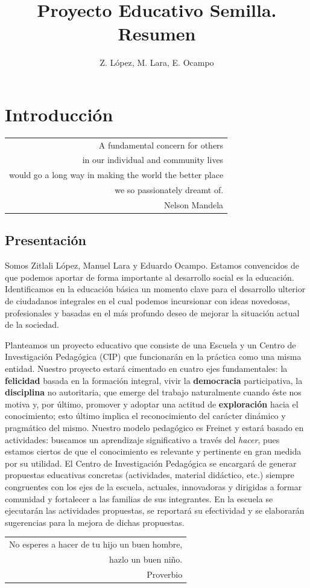 \documentclass[10pt,letterpaper,oneside]{book}
\author{Z. López, M. Lara, E. Ocampo}
\title{Proyecto Educativo Semilla. Resumen}
\makeatletter
\newenvironment{myepigraph}
  {\par\hfill\itshape
   \begin{tabular}{@{}r@{\hspace{2em}}}} %
  {\end{tabular}\par\medskip}
\makeatother
\begin{document}
\maketitle
\tableofcontents

\chapter{Introducción}

\begin{myepigraph}A fundamental concern for others\\
in our individual and community lives\\
would go a long way in making the world the better place\\
we so passionately dreamt of.
\vspace{0.1cm}\\
Nelson Mandela
\end{myepigraph}

\section{Presentación}

Somos Zitlali López, Manuel Lara y Eduardo Ocampo. Estamos convencidos de que podemos aportar de forma importante al desarrollo social es la educación. Identificamos en la educación básica un momento clave para el desarrollo ulterior de ciudadanos integrales en el cual podemos incursionar con ideas novedosas, profesionales y basadas en el más profundo deseo de mejorar la situación actual de la sociedad.

Planteamos un proyecto educativo que consiste de una Escuela y un Centro de Investigación Pedagógica (CIP) que funcionarán en la práctica como una misma entidad. Nuestro proyecto estará cimentado en cuatro ejes fundamentales: la {\bf felicidad} basada en la formación integral, vivir la {\bf democracia} participativa, la {\bf disciplina} no autoritaria, que emerge del trabajo naturalmente cuando éste nos motiva y, por último, promover y adoptar una actitud de {\bf exploración} hacia el conocimiento; esto último implica el reconocimiento del carácter dinámico y pragmático del mismo. Nuestro modelo pedagógico es Freinet y estará basado en actividades: buscamos un aprendizaje significativo a través del \emph{hacer}, pues estamos ciertos de que el conocimiento es relevante y pertinente en gran medida por su utilidad. El Centro de Investigación Pedagógica se encargará de generar propuestas educativas concretas (actividades, material didáctico, etc.) siempre congruentes con los ejes de la escuela, actuales, innovadoras y dirigidas a formar comunidad y fortalecer a las familias de sus integrantes. En la escuela se ejecutarán las actividades propuestas, se reportará su efectividad y se elaborarán sugerencias para la mejora de dichas propuestas.
\vspace{1cm}
\begin{myepigraph}No esperes a hacer de tu hijo un buen hombre,\\
hazlo un buen niño.
\vspace{0.1cm}\\
Proverbio
\end{myepigraph}
\end{document}
